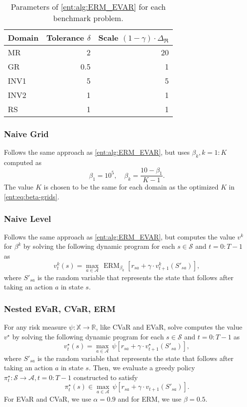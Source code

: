 \documentclass[twoside]{article}
\newcommand{\states}{\mathcal{S}}
\newcommand{\actions}{\mathcal{A}}
\newcommand{\opt}{^\star}
\newcommand{\vspan}{\Delta_{\mathfrak{R}}}
\newcommand{\erm}[2]{\operatorname{ERM}_{#1}\left[#2\right]}
\newcommand{\risk}[1]{\psi \left[#1\right]}
\newcommand{\risko}{\psi}
\newcommand{\Real}{\mathbb{R}}
\theoremstyle{plain}
\theoremstyle{definition}
\theoremstyle{remark}
\begin{document}
\begin{table}
  \caption{Parameters of \cref{ent:alg:ERM_EVAR} for each benchmark problem. }
  \label{ent:tab:evar-algo-params}
  \centering
  \begin{tabular}{l|rr}
    \toprule
    Domain & Tolerance $\delta$ & Scale $(1-\gamma) \cdot \vspan$  \\
    \midrule
    MR & 2 & 20 \\
    GR & 0.5 & 1 \\
    INV1 & 5 & 5 \\
    INV2 & 1 & 1 \\
    RS & 1 & 1 \\
    \bottomrule                                  
  \end{tabular}
\end{table}

\subsubsection{Naive Grid}

Follows the same approach as \cref{ent:alg:ERM_EVAR}, but uses $\beta_k, k = 1{:}K$ computed as
\[
 \beta_1 = 10^{5}, \quad  \beta_k = \frac{10 - \beta_1}{K-1}.
\]
The value $K$ is chosen to be the same for each domain as the optimized $K$ in \eqref{ent:eq:beta-grids}.

\subsubsection{Naive Level}


Follows the same approach as \cref{ent:alg:ERM_EVAR}, but computes the value $v^k$ for $\beta^k$ by solving the following dynamic program for each $s\in \states $ and $t=0{:}T{-}1$ as
\[
 v_t^k(s) = \max_{a\in \actions} \, \erm{\beta_k}{r_{sa} + \gamma \cdot v_{t+1}^k( S'_{sa})}, 
\]
where $S'_{sa}$ is the random variable that represents the state that follows after taking an action $a$ in state $s$.

\subsubsection{Nested EVaR, CVaR, ERM}

For any risk measure $\risko\colon \mathbb{X} \to \Real$, like CVaR and EVaR, solve computes the value $v\opt$ by solving the following dynamic program for each $s\in \states $ and $t=0{:}T{-}1$ as
\[
 v_t\opt (s) = \max_{a\in \actions} \, \risk{r_{sa} + \gamma \cdot v_{t+1}\opt (S'_{sa})}, 
\]
where $S'_{sa}$ is the random variable that represents the state that follows after taking an action $a$ in state $s$. Then, we evaluate a greedy policy $\pi_t\opt\colon \states \to \actions, t=0{:}T{-}1$ constructed to satisfy
\[
 \pi_t\opt(s) \in \max_{a\in \actions} \, \risk{r_{sa} + \gamma \cdot v_{t+1}(S'_{sa})}. 
\]
For EVaR and CVaR, we use $\alpha = 0.9$ and for ERM, we use $\beta=0.5$.
\end{document}
